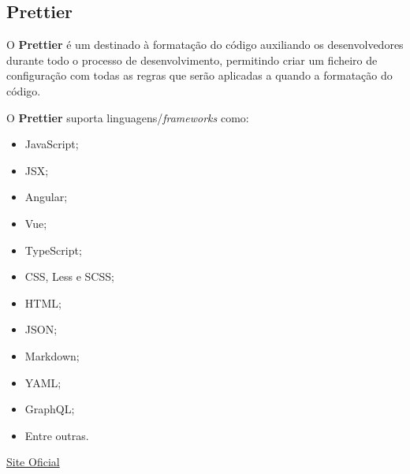 \subsection{Prettier}

\begin{minipage}{.3\textwidth}
\end{minipage}
\begin{minipage}{.7\textwidth}
	\minipagerestore
	O \textbf{Prettier} é um  destinado à formatação do código auxiliando os desenvolvedores durante todo o processo de desenvolvimento, permitindo criar um ficheiro de configuração com todas as regras que serão aplicadas a quando a formatação do código.

	O \textbf{Prettier} suporta linguagens/\textit{frameworks} como:

	\begin{itemize}
		\item JavaScript;
		\item JSX;
		\item Angular;
		\item Vue;
		\item TypeScript;
		\item CSS, Less e SCSS;
		\item HTML;
		\item JSON;
		\item Markdown;
		\item YAML;
		\item GraphQL;
		\item Entre outras.
	\end{itemize}


	\href{https://prettier.io}{Site Oficial}
\end{minipage}

